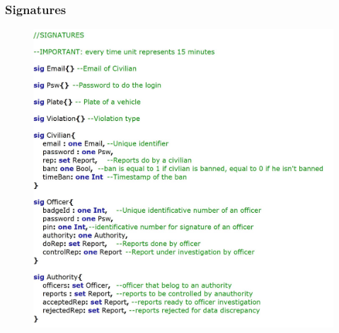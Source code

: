\documentclass[12pt,a4paper]{article}
\begin{document}
\subsubsection{Signatures}
\begin{figure}[H]
\begin{adjustwidth}{-25mm}{-25mm}
				\centering
				\includegraphics[width=.75\paperwidth,height=.75\paperheight, keepaspectratio]{Images/Alloy/sig1}
\end{adjustwidth}
\end{figure}
\end{document}
